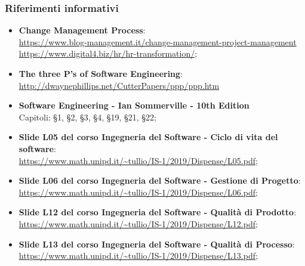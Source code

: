 \subsubsection{Riferimenti informativi}
\begin{itemize}
	\item \textbf{Change Management Process}: \\
	\href{https://www.blog-management.it/2018/04/10/change-management-project-management/}{https://www.blog-management.it/change-management-project-management}\\
	\href{https://www.digital4.biz/hr/hr-transformation/digital-transformation-e-change-management-vanno-avanti-di-pari-passo/}{https://www.digital4.biz/hr/hr-transformation/};
	\item \textbf{The three P's of Software Engineering}: \\
	\url{http://dwaynephillips.net/CutterPapers/ppp/ppp.htm}
	\item \textbf{Software Engineering - Ian Sommerville - 10th Edition} \\
	Capitoli: \S 1, \S 2, \S 3, \S 4, \S 19, \S 21, \S 22;
	\item \textbf{Slide L05 del corso Ingegneria del Software - Ciclo di vita del software}: \\ 
	\url{https://www.math.unipd.it/~tullio/IS-1/2019/Dispense/L05.pdf};
	\item \textbf{Slide L06 del corso Ingegneria del Software - Gestione di Progetto}: \\
	\url{https://www.math.unipd.it/~tullio/IS-1/2019/Dispense/L06.pdf};	
	\item \textbf{Slide L12 del corso Ingegneria del Software - Qualità di Prodotto}: \\
	\url{https://www.math.unipd.it/~tullio/IS-1/2019/Dispense/L12.pdf};
	\item \textbf{Slide L13 del corso Ingegneria del Software - Qualità di Processo}: \\
	\url{https://www.math.unipd.it/~tullio/IS-1/2019/Dispense/L13.pdf};
\end{itemize}